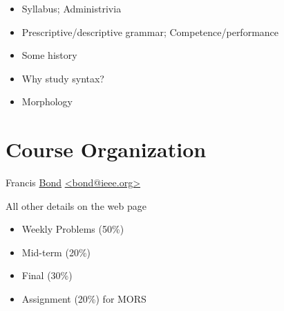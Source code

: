 \documentclass[a4paper,landscape,headrule,footrule]{foils}
\begin{document}
\maketitle

%


\begin{itemize}
\item Syllabus; Administrivia
\item Prescriptive/descriptive grammar;
Competence/performance
\item Some history
\item Why study syntax?
\item Morphology
\end{itemize}

\section{Course Organization}

\begin{description}
\item [Coordinator]  Francis \ul{Bond} 
\url{<bond@ieee.org>}
\item All other details on the web page

\end{description}



\begin{itemize}
\item Weekly Problems (50\%)
\item Mid-term (20\%)
\item Final (30\%)
\item Assignment (20\%) for MORS
\end{itemize}
\end{document}
